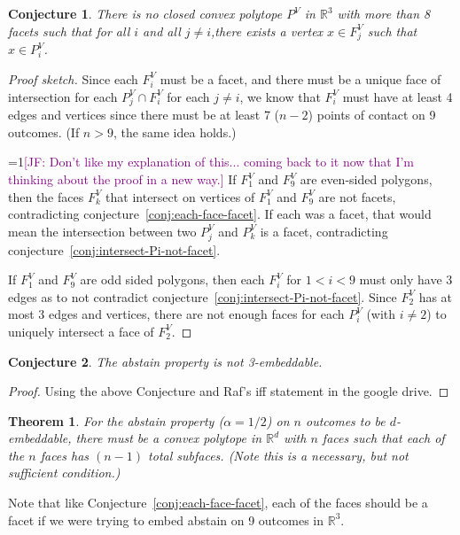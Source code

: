 \documentclass[12pt]{article}
\newcommand{\Comments}{1}
\newcommand{\mynote}[2]{\ifnum\Comments=1\textcolor{#1}{#2}\fi}
\newcommand{\jessie}[1]{\mynote{purple}{[JF: #1]}}
\newcommand{\reals}{\mathbb{R}}
\newtheorem{theorem}{Theorem}
\newtheorem{conjecture}{Conjecture}
\begin{document}
\begin{conjecture}
	There is no closed convex polytope $P^V$ in $\reals^3$ with more than 8 facets such that for all $i$ and all $j \neq i$,there exists a vertex $x \in F_j^V$ such that $x \in P^V_i$.
\end{conjecture}
\begin{proof}[Proof sketch]
	Since each $F_i^V$ must be a facet, and there must be a unique face of intersection for each $P_j^V \cap F_i^V$ for each $j \neq i$, we know that $F_i^V$ must have at least 4 edges and vertices since there must be at least 7 ($n-2$) points of contact on 9 outcomes. 
	(If $n > 9$, the same idea holds.)
	
	\jessie{Don't like my explanation of this... coming back to it now that I'm thinking about the proof in a new way.}
	If $F_1^V$ and $F_9^V$ are even-sided polygons, then the faces $F_k^V$ that intersect on vertices of $F_1^V$ and $F_9^V$ are not facets, contradicting conjecture~\ref{conj:each-face-facet}.
	If each was a facet, that would mean the intersection between two $P_j^V$ and $P_k^V$ is a facet, contradicting conjecture~\ref{conj:intersect-Pi-not-facet}.
	
	If $F_1^V$ and $F_9^V$ are odd sided polygons, then each $F_i^V$ for $1 < i < 9$ must only have 3 edges as to not contradict conjecture~\ref{conj:intersect-Pi-not-facet}.
	Since $F_2^V$ has at most 3 edges and vertices, there are not enough faces for each $P_i^V$ (with $i \neq 2$) to uniquely intersect a face of $F_2^V$.
\end{proof}

\begin{conjecture}
	The abstain property is not 3-embeddable.
\end{conjecture}
\begin{proof}
	Using the above Conjecture and Raf's iff statement in the google drive.
\end{proof}

\newpage
\begin{theorem}
	For the abstain property ($\alpha = 1/2$) on $n$ outcomes to be $d$-embeddable, there must be a convex polytope in $\reals^d$ with $n$ faces such that each of the $n$ faces has $(n-1)$ total subfaces.
	(Note this is a necessary, but not sufficient condition.)
\end{theorem}

Note that like Conjecture~\ref{conj:each-face-facet}, each of the faces should be a facet if we were trying to embed abstain on 9 outcomes in $\reals^3$.
\end{document}
